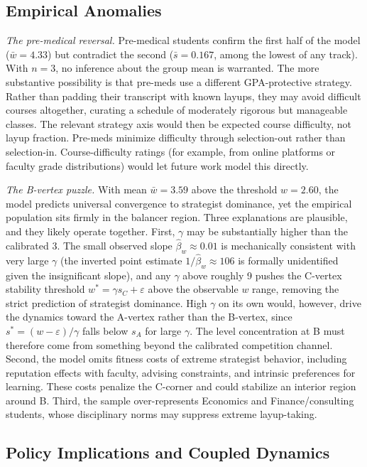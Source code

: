 \documentclass[12pt]{article}
\begin{document}
\subsection{Empirical Anomalies}

\textit{The pre-medical reversal.}
Pre-medical students confirm the first half of the model
($\bar w = 4.33$) but contradict the second ($\bar s = 0.167$, among
the lowest of any track). With $n = 3$, no inference about the group
mean is warranted. The more substantive possibility is that pre-meds use a
different GPA-protective strategy. Rather than padding their
transcript with known layups, they may avoid difficult courses
altogether, curating a schedule of moderately rigorous but manageable
classes. The relevant strategy axis would then be expected course
difficulty, not layup fraction. Pre-meds minimize difficulty through
selection-out rather than selection-in. Course-difficulty ratings (for
example, from online platforms or faculty grade distributions) would
let future work model this directly.

\textit{The B-vertex puzzle.}
With mean $\bar w = 3.59$ above the threshold $w = 2.60$, the
model predicts universal convergence to strategist dominance, yet the
empirical population sits firmly in the balancer region. Three
explanations are plausible, and they likely operate together. First,
$\gamma$ may be substantially higher than the calibrated 3. The small
observed slope $\hat\beta_w \approx 0.01$ is mechanically consistent
with very large $\gamma$ (the inverted point estimate
$1/\hat\beta_w \approx 106$ is formally unidentified given the
insignificant slope), and any $\gamma$ above roughly 9 pushes the
C-vertex stability threshold $w^\ast = \gamma s_C + \varepsilon$ above
the observable $w$ range, removing the strict prediction of strategist
dominance. High $\gamma$ on its own would, however, drive the dynamics
toward the A-vertex rather than the B-vertex, since
$s^\ast = (w - \varepsilon)/\gamma$ falls below $s_A$ for large
$\gamma$. The level concentration at B must therefore come from
something beyond the calibrated competition channel. Second, the
model omits fitness costs of extreme strategist behavior, including
reputation effects with faculty, advising constraints, and intrinsic
preferences for learning. These costs penalize the C-corner and could
stabilize an interior region around B. Third, the sample
over-represents Economics and Finance/consulting students, whose
disciplinary norms may suppress extreme layup-taking.

\subsection{Policy Implications and Coupled Dynamics}
\end{document}
